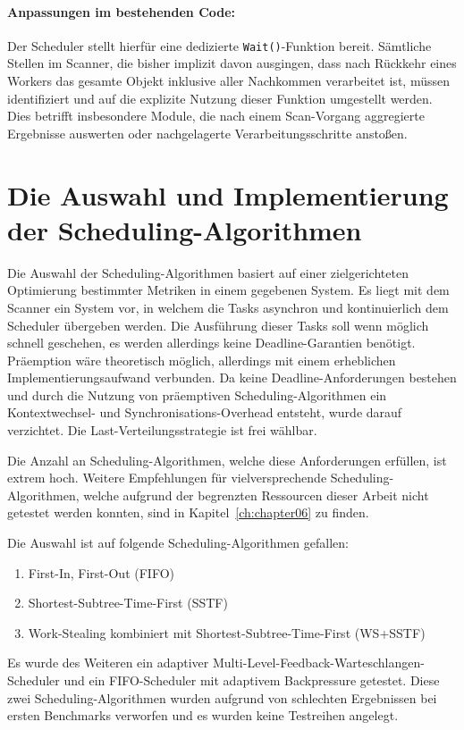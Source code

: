 \begin{sloppypar}
\paragraph{Anpassungen im bestehenden Code:}
Der Scheduler stellt hierfür eine dedizierte \texttt{Wait()}-Funktion bereit.
Sämtliche Stellen im Scanner, die bisher implizit davon ausgingen,
dass nach Rückkehr eines Workers das gesamte Objekt inklusive aller Nachkommen verarbeitet ist,
müssen identifiziert und auf die explizite Nutzung dieser Funktion umgestellt werden.
Dies betrifft insbesondere Module, die nach einem Scan-Vorgang aggregierte Ergebnisse auswerten
oder nachgelagerte Verarbeitungsschritte anstoßen.



\section{Die Auswahl und Implementierung der Scheduling-Algorithmen}
Die Auswahl der Scheduling-Algorithmen basiert 
auf einer zielgerichteten Optimierung bestimmter Metriken in einem gegebenen System.
Es liegt mit dem Scanner ein System vor, in welchem die Tasks asynchron und kontinuierlich dem Scheduler übergeben werden.
Die Ausführung dieser Tasks soll wenn möglich schnell geschehen, es werden allerdings keine Deadline-Garantien benötigt.
Präemption wäre theoretisch möglich, allerdings mit einem erheblichen Implementierungsaufwand verbunden.
Da keine Deadline-Anforderungen bestehen und durch die Nutzung von präemptiven Scheduling-Algorithmen ein Kontextwechsel- und Synchronisations-Overhead entsteht, 
wurde darauf verzichtet.
Die Last-Verteilungsstrategie ist frei wählbar.

\vspace{7.56mm}

\noindent Die Anzahl an Scheduling-Algorithmen, welche diese Anforderungen erfüllen, ist extrem hoch.
Weitere Empfehlungen für vielversprechende Scheduling-Algorithmen, 
welche aufgrund der begrenzten Ressourcen dieser Arbeit nicht getestet werden konnten, 
sind in Kapitel~\ref{ch:chapter06} zu finden.

\vspace{7.56mm}
Die Auswahl ist auf folgende Scheduling-Algorithmen gefallen:

 \begin{enumerate}
     \item First-In, First-Out (\acs{FIFO})
     \item Shortest-Subtree-Time-First (\acs{SSTF})
     \item Work-Stealing kombiniert mit Shortest-Subtree-Time-First (\acs{WS}+\acs{SSTF})
 \end{enumerate}
Es wurde des Weiteren ein adaptiver Multi-Level-Feedback-Warteschlangen-Scheduler
und ein \acs{FIFO}-Scheduler mit adaptivem Backpressure getestet.
Diese zwei Scheduling-Algorithmen wurden aufgrund von schlechten Ergebnissen bei ersten Benchmarks verworfen und es wurden keine Testreihen angelegt.



\end{sloppypar}
